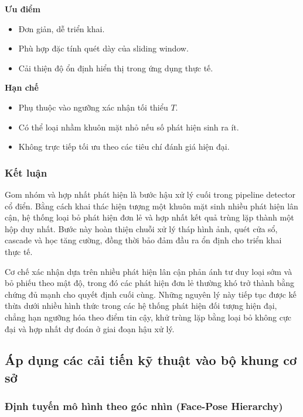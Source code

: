 \noindent\textbf{Ưu điểm}
\begin{itemize}
  \item Đơn giản, dễ triển khai.
  \item Phù hợp đặc tính quét dày của sliding window.
  \item Cải thiện độ ổn định hiển thị trong ứng dụng thực tế.
\end{itemize}

\noindent\textbf{Hạn chế}
\begin{itemize}
  \item Phụ thuộc vào ngưỡng xác nhận tối thiểu $T$.
  \item Có thể loại nhầm khuôn mặt nhỏ nếu số phát hiện sinh ra ít.
  \item Không trực tiếp tối ưu theo các tiêu chí đánh giá hiện đại.
\end{itemize}

\subsubsection{Kết luận}

Gom nhóm và hợp nhất phát hiện là bước hậu xử lý cuối trong pipeline detector cổ điển.
Bằng cách khai thác hiện tượng một khuôn mặt sinh nhiều phát hiện lân cận, hệ thống loại bỏ phát hiện đơn lẻ và hợp nhất kết quả trùng lặp thành một hộp duy nhất.
Bước này hoàn thiện chuỗi xử lý tháp hình ảnh, quét cửa sổ, cascade và học tăng cường, đồng thời bảo đảm đầu ra ổn định cho triển khai thực tế. \cite{li2012facechapter,opencv_cascade_docs}

Cơ chế xác nhận dựa trên nhiều phát hiện lân cận phản ánh tư duy loại sớm và bỏ phiếu theo mật độ, trong đó các phát hiện đơn lẻ thường khó trở thành bằng chứng đủ mạnh cho quyết định cuối cùng.
Những nguyên lý này tiếp tục được kế thừa dưới nhiều hình thức trong các hệ thống phát hiện đối tượng hiện đại, chẳng hạn ngưỡng hóa theo điểm tin cậy, khử trùng lặp bằng loại bỏ không cực đại và hợp nhất dự đoán ở giai đoạn hậu xử lý. \cite{ren2015faster,lin2017focal}

\subsection{Áp dụng các cải tiến kỹ thuật vào bộ khung cơ sở}

\subsubsection{Định tuyến mô hình theo góc nhìn (Face-Pose Hierarchy)}

